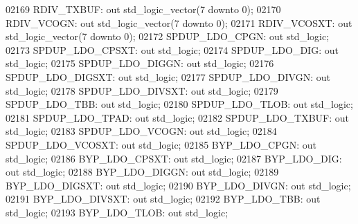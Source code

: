 \begin{DoxyCode}
02169     RDIV\_TXBUF: \textcolor{keywordflow}{out} \textcolor{comment}{std\_logic\_vector}(\textcolor{vhdllogic}{}\textcolor{vhdllogic}{7} \textcolor{keywordflow}{downto} \textcolor{vhdllogic}{}\textcolor{vhdllogic}{0});
02170     RDIV\_VCOGN: \textcolor{keywordflow}{out} \textcolor{comment}{std\_logic\_vector}(\textcolor{vhdllogic}{}\textcolor{vhdllogic}{7} \textcolor{keywordflow}{downto} \textcolor{vhdllogic}{}\textcolor{vhdllogic}{0});
02171     RDIV\_VCOSXT:    \textcolor{keywordflow}{out} \textcolor{comment}{std\_logic\_vector}(\textcolor{vhdllogic}{}\textcolor{vhdllogic}{7} \textcolor{keywordflow}{downto} \textcolor{vhdllogic}{}\textcolor{vhdllogic}{0});
02172     SPDUP\_LDO\_CPGN: \textcolor{keywordflow}{out} \textcolor{comment}{std\_logic};
02173     SPDUP\_LDO\_CPSXT:    \textcolor{keywordflow}{out} \textcolor{comment}{std\_logic};
02174     SPDUP\_LDO\_DIG:  \textcolor{keywordflow}{out} \textcolor{comment}{std\_logic};
02175     SPDUP\_LDO\_DIGGN:    \textcolor{keywordflow}{out} \textcolor{comment}{std\_logic};
02176     SPDUP\_LDO\_DIGSXT:   \textcolor{keywordflow}{out} \textcolor{comment}{std\_logic};
02177     SPDUP\_LDO\_DIVGN:    \textcolor{keywordflow}{out} \textcolor{comment}{std\_logic};
02178     SPDUP\_LDO\_DIVSXT:   \textcolor{keywordflow}{out} \textcolor{comment}{std\_logic};
02179     SPDUP\_LDO\_TBB:  \textcolor{keywordflow}{out} \textcolor{comment}{std\_logic};
02180     SPDUP\_LDO\_TLOB: \textcolor{keywordflow}{out} \textcolor{comment}{std\_logic};
02181     SPDUP\_LDO\_TPAD: \textcolor{keywordflow}{out} \textcolor{comment}{std\_logic};
02182     SPDUP\_LDO\_TXBUF:    \textcolor{keywordflow}{out} \textcolor{comment}{std\_logic};
02183     SPDUP\_LDO\_VCOGN:    \textcolor{keywordflow}{out} \textcolor{comment}{std\_logic};
02184     SPDUP\_LDO\_VCOSXT:   \textcolor{keywordflow}{out} \textcolor{comment}{std\_logic};
02185     BYP\_LDO\_CPGN:   \textcolor{keywordflow}{out} \textcolor{comment}{std\_logic};
02186     BYP\_LDO\_CPSXT:  \textcolor{keywordflow}{out} \textcolor{comment}{std\_logic};
02187     BYP\_LDO\_DIG:    \textcolor{keywordflow}{out} \textcolor{comment}{std\_logic};
02188     BYP\_LDO\_DIGGN:  \textcolor{keywordflow}{out} \textcolor{comment}{std\_logic};
02189     BYP\_LDO\_DIGSXT: \textcolor{keywordflow}{out} \textcolor{comment}{std\_logic};
02190     BYP\_LDO\_DIVGN:  \textcolor{keywordflow}{out} \textcolor{comment}{std\_logic};
02191     BYP\_LDO\_DIVSXT: \textcolor{keywordflow}{out} \textcolor{comment}{std\_logic};
02192     BYP\_LDO\_TBB:    \textcolor{keywordflow}{out} \textcolor{comment}{std\_logic};
02193     BYP\_LDO\_TLOB:   \textcolor{keywordflow}{out} \textcolor{comment}{std\_logic};

\end{DoxyCode}
